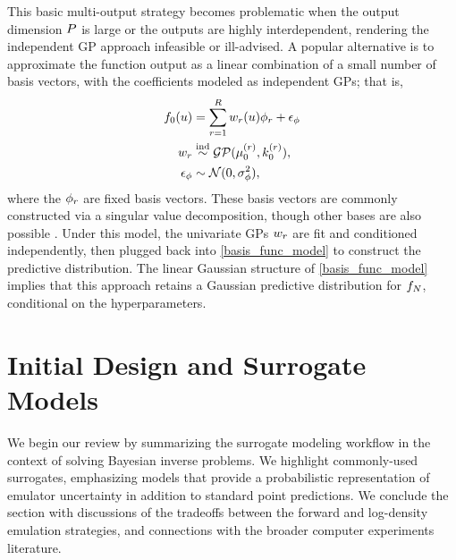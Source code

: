 \documentclass[12pt]{article}
\begin{document}
This basic multi-output strategy becomes problematic when the output dimension $\dimObs$ 
is large or the outputs are highly interdependent, rendering the independent GP approach infeasible or ill-advised.
A popular alternative is to approximate the function output as a linear combination of a small number
of basis vectors, with the coefficients modeled as independent GPs; that is, 
\begin{align}
\funcPrior(\Par) &= \sum_{\idxBasis=1}^{\dimBasis} \basisWeight_{\idxBasis}(\Par) \basisVec_{\idxBasis} + \noise_{\basisVec} \label{basis_func_model} \\
\basisWeight_{\idxBasis} &\overset{\textrm{ind}}{\sim} \GP(\emMean[0]{(\idxBasis)}, \emKer[0]{(\idxBasis)}), \label{basis_func_GPs} \\
 \noise_{\basisVec} &\sim \Gaussian(0, \sigma^2_{\basisVec}), \label{basis_func_noise}
\end{align}
where the $\basisVec_{\idxBasis}$ are fixed basis vectors.
These basis vectors are commonly constructed via a singular value decomposition, though other 
bases are also possible \citep{HigdonBasis, emulate_functional_output, functionValuedModels, PODemulation}.
Under this model, the univariate GPs $\basisWeight_{\idxBasis}$ are fit and conditioned independently, then 
plugged back into \cref{basis_func_model} to construct the predictive distribution. The linear Gaussian 
structure of \cref{basis_func_model} implies that this approach retains a Gaussian predictive distribution
for $\funcEm[\Ndesign]$, conditional on the hyperparameters.

\section{Initial Design and Surrogate Models}
We begin our review by summarizing the surrogate modeling workflow in the context of solving
Bayesian inverse problems. We highlight commonly-used surrogates, emphasizing
models that provide a probabilistic representation of emulator uncertainty in addition to 
standard point predictions. We conclude the section with discussions of the tradeoffs
between the forward and log-density emulation strategies, and connections with the 
broader computer experiments literature.
\end{document}
